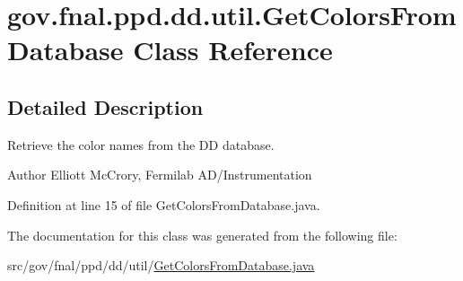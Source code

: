\hypertarget{classgov_1_1fnal_1_1ppd_1_1dd_1_1util_1_1GetColorsFromDatabase}{\section{gov.\-fnal.\-ppd.\-dd.\-util.\-Get\-Colors\-From\-Database Class Reference}
\label{classgov_1_1fnal_1_1ppd_1_1dd_1_1util_1_1GetColorsFromDatabase}
}


\subsection{Detailed Description}
Retrieve the color names from the D\-D database.

\begin{DoxyAuthor}{Author}
Elliott Mc\-Crory, Fermilab A\-D/\-Instrumentation 
\end{DoxyAuthor}


Definition at line 15 of file Get\-Colors\-From\-Database.\-java.



The documentation for this class was generated from the following file\-:\begin{DoxyCompactItemize}
\item 
src/gov/fnal/ppd/dd/util/\hyperlink{GetColorsFromDatabase_8java}{Get\-Colors\-From\-Database.\-java}\end{DoxyCompactItemize}
